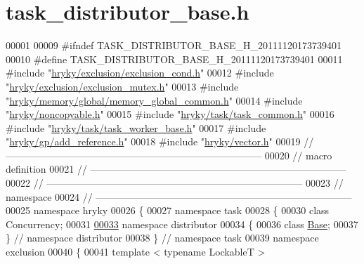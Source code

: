 \hypertarget{task__distributor__base_8h_source}{\section{task\-\_\-distributor\-\_\-base.\-h}
}

\begin{DoxyCode}
00001 
00009 \textcolor{preprocessor}{#ifndef TASK\_DISTRIBUTOR\_BASE\_H\_20111120173739401}
00010 \textcolor{preprocessor}{}\textcolor{preprocessor}{#define TASK\_DISTRIBUTOR\_BASE\_H\_20111120173739401}
00011 \textcolor{preprocessor}{}\textcolor{preprocessor}{#include "\hyperlink{exclusion__cond_8h}{hryky/exclusion/exclusion_cond.h}"}
00012 \textcolor{preprocessor}{#include "\hyperlink{exclusion__mutex_8h}{hryky/exclusion/exclusion_mutex.h}"}
00013 \textcolor{preprocessor}{#include "\hyperlink{memory__global__common_8h}{hryky/memory/global/memory_global_common.h}"}
00014 \textcolor{preprocessor}{#include "\hyperlink{noncopyable_8h}{hryky/noncopyable.h}"}
00015 \textcolor{preprocessor}{#include "\hyperlink{task__common_8h}{hryky/task/task_common.h}"}
00016 \textcolor{preprocessor}{#include "\hyperlink{task__worker__base_8h}{hryky/task/task_worker_base.h}"}
00017 \textcolor{preprocessor}{#include "\hyperlink{add__reference_8h}{hryky/gp/add_reference.h}"}
00018 \textcolor{preprocessor}{#include "\hyperlink{vector_8h}{hryky/vector.h}"}
00019 \textcolor{comment}{//
      ------------------------------------------------------------------------------}
00020 \textcolor{comment}{// macro definition}
00021 \textcolor{comment}{//
      ------------------------------------------------------------------------------}
00022 \textcolor{comment}{//
      ------------------------------------------------------------------------------}
00023 \textcolor{comment}{// namespace}
00024 \textcolor{comment}{//
      ------------------------------------------------------------------------------}
00025 \textcolor{keyword}{namespace }hryky
00026 \{
00027 \textcolor{keyword}{namespace }task
00028 \{
00030     \textcolor{keyword}{class }Concurrency;
00031 
\hypertarget{task__distributor__base_8h_source_l00033}{}\hyperlink{namespacehryky_1_1task_1_1distributor}{00033} \textcolor{keyword}{namespace }distributor
00034 \{
00036     \textcolor{keyword}{class }\hyperlink{classhryky_1_1task_1_1distributor_1_1_base}{Base};
00037 \} \textcolor{comment}{// namespace distributor}
00038 \} \textcolor{comment}{// namespace task}
00039 \textcolor{keyword}{namespace }exclusion
00040 \{
00041     \textcolor{keyword}{template} < \textcolor{keyword}{typename} LockableT >

\end{DoxyCode}
